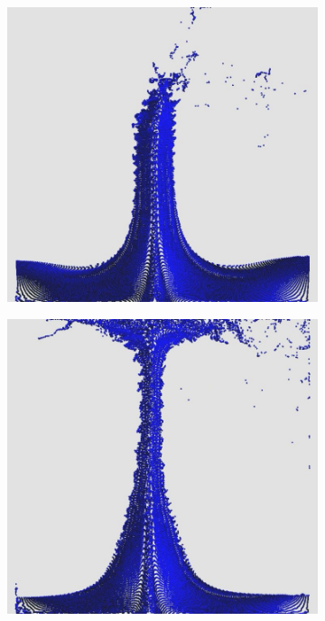 \documentclass[12pt,a4paper,dvipsnames]{article}
\begin{document}
\begin{figure}[!ht]
\begin{subfigure}[!h]{0.3\textwidth}
	\end{subfigure}
	\begin{subfigure}[!h]{0.3\textwidth} \centering
		\includegraphics[width=\textwidth]{DDB/DDB-06.jpg}
	\end{subfigure}
	\begin{subfigure}[!h]{0.3\textwidth} \centering
		\includegraphics[width=\textwidth]{DDB/DDB-07.jpg}

\end{subfigure}
\end{figure}
\end{document}
